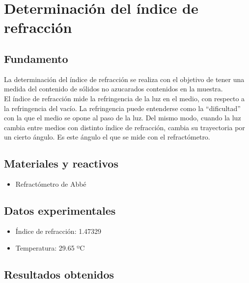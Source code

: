 \documentclass[a4paper,12pt]{article} %
\begin{document}
\section{Determinación del índice de refracción}
\subsection{Fundamento}
La determinación del índice de refracción se realiza con el objetivo de tener una medida del contenido de sólidos no azucarados contenidos en la muestra.\\

El índice de refracción mide la refringencia de la luz en el medio, con respecto a la refringencia del vacío. La refringencia puede entenderse como la ``dificultad'' con la que el medio se opone al paso de la luz. Del mismo modo, cuando la luz cambia entre medios con distinto índice de refracción, cambia su trayectoria por un cierto ángulo. Es este ángulo el que se mide con el refractómetro.



\subsection{Materiales y reactivos}
\begin{itemize}
    \item Refractómetro de Abbé
\end{itemize}

\subsection{Datos experimentales}
\begin{itemize}
    \item Índice de refracción: 1.47329
    \item Temperatura: 29.65 ºC
\end{itemize}


\subsection{Resultados obtenidos}
\end{document}
